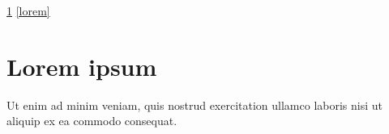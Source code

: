 \ref{somelabel}
\relax
\ref{lorem}

\section{Lorem ipsum}
\label{somelabel}

Ut enim ad minim veniam, quis nostrud exercitation ullamco laboris
nisi ut aliquip ex ea commodo consequat.

\cite{thor}


